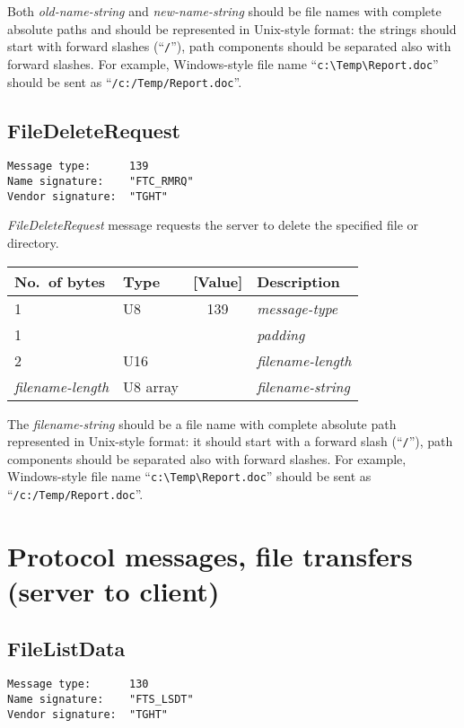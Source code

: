 \documentclass[a4paper]{article}
\newcommand{\typestr}[1]{\textit{#1}}
\begin{document}
Both \typestr{old-name-string} and \typestr{new-name-string} should be
file names with complete absolute paths and should be represented in
Unix-style format: the strings should start with forward slashes
(``\verb|/|''), path components should be separated also with forward
slashes. For example, Windows-style file name
``\verb|c:\Temp\Report.doc|'' should be sent as
``\verb|/c:/Temp/Report.doc|''.


\newpage
\subsection{FileDeleteRequest}
\begin{verbatim}
Message type:      139
Name signature:    "FTC_RMRQ"
Vendor signature:  "TGHT"
\end{verbatim}

\typestr{FileDeleteRequest} message requests the server to delete the
specified file or directory.

\begin{tabular}{l|lc|l} \hline
No.\ of bytes & Type & [Value] & Description \\ \hline
1 & U8  & 139 & \typestr{message-type} \\
1 &     &     & \typestr{padding} \\
2 & U16 &     & \typestr{filename-length} \\
\typestr{filename-length} & U8 array & & \typestr{filename-string} \\
\hline\end{tabular}

The \typestr{filename-string} should be a file name with complete
absolute path represented in Unix-style format: it should start with a
forward slash (``\verb|/|''), path components should be separated also
with forward slashes. For example, Windows-style file name
``\verb|c:\Temp\Report.doc|'' should be sent as
``\verb|/c:/Temp/Report.doc|''.

\newpage
\section{Protocol messages, file transfers (server to client)}

\subsection{FileListData}
\begin{verbatim}
Message type:      130
Name signature:    "FTS_LSDT"
Vendor signature:  "TGHT"
\end{verbatim}
\end{document}
